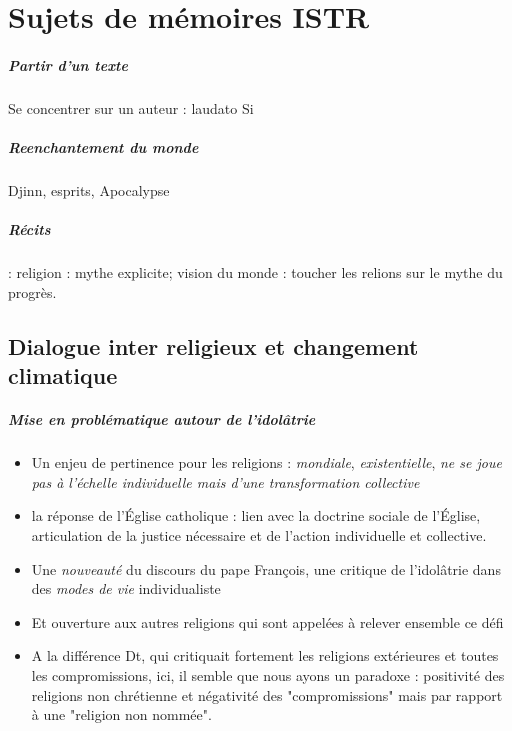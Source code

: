 \chapter{Sujets de mémoires ISTR}

\paragraph{Partir d'un texte} 
Se concentrer sur un auteur : laudato Si

\paragraph{Reenchantement du monde}
 Djinn, esprits, Apocalypse

\paragraph{Récits}
 : religion : mythe explicite; vision du monde : toucher les relions sur le mythe du progrès. 


\section{Dialogue inter religieux et changement climatique}

\paragraph{Mise en problématique autour de l'idolâtrie}
\begin{itemize}
    \item Un enjeu de pertinence pour les religions : \textit{mondiale}, \textit{existentielle}, \textit{ne se joue pas à l'échelle individuelle mais d'une transformation collective}
    \item la réponse de l'Église catholique : lien avec la doctrine sociale de l'Église, articulation de la justice nécessaire et de l'action individuelle et collective. 
    \item Une \textit{nouveauté} du discours du pape François, une critique de l'idolâtrie dans des \textit{modes de vie} individualiste
    \item Et ouverture aux autres religions qui sont appelées à relever ensemble ce défi
    \item A la différence Dt, qui critiquait fortement les religions extérieures et toutes les compromissions, ici, il semble que nous ayons un paradoxe : positivité des religions non chrétienne et négativité des "compromissions" mais par rapport à une "religion non nommée".
  
\end{itemize}


